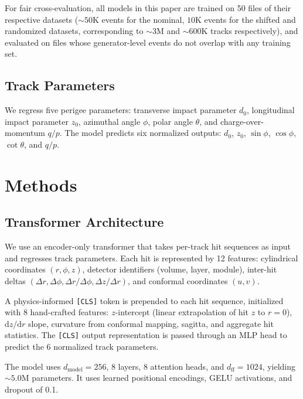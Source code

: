 \documentclass[11pt]{article}
\begin{document}
For fair cross-evaluation, all models in this paper are trained on 50 files of their respective datasets ($\sim50$K events for the nominal, $10$K events for the shifted and randomized datasets, corresponding to ${\sim}3$M and ${\sim}600$K tracks respectively), and evaluated on files whose generator-level events do not overlap with any training set.

\subsection{Track Parameters}

We regress five perigee parameters: transverse impact parameter $d_0$, longitudinal impact parameter $z_0$, azimuthal angle $\phi$, polar angle $\theta$, and charge-over-momentum $q/p$.
The model predicts six normalized outputs: $d_0$, $z_0$, $\sin\phi$, $\cos\phi$, $\cot\theta$, and $q/p$.

\section{Methods}
\label{sec:methods}

\subsection{Transformer Architecture}

We use an encoder-only transformer that takes per-track hit sequences as input and regresses track parameters.
Each hit is represented by 12 features: cylindrical coordinates $(r, \phi, z)$, detector identifiers (volume, layer, module), inter-hit deltas $(\Delta r, \Delta\phi, \Delta r/\Delta\phi, \Delta z/\Delta r)$, and conformal coordinates $(u, v)$.

A physics-informed \texttt{[CLS]} token is prepended to each hit sequence, initialized with 8 hand-crafted features: $z$-intercept (linear extrapolation of hit $z$ to $r=0$), $\mathrm{d}z/\mathrm{d}r$ slope, curvature from conformal mapping, sagitta, and aggregate hit statistics.
The \texttt{[CLS]} output representation is passed through an MLP head to predict the 6 normalized track parameters.

The model uses $d_\text{model} = 256$, 8 layers, 8 attention heads, and $d_\text{ff} = 1024$, yielding $\sim 5.0$M parameters.
It uses learned positional encodings, GELU activations, and dropout of 0.1.
\end{document}
